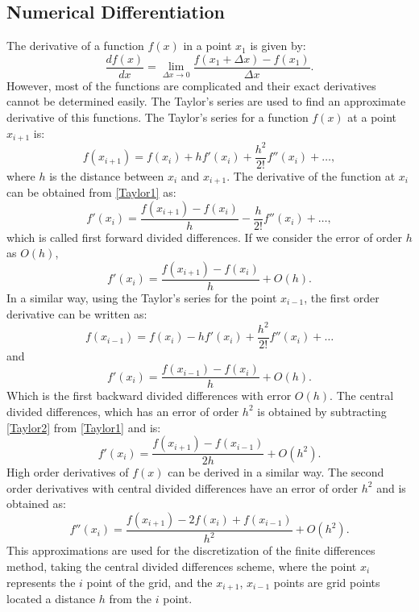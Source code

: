 \documentclass[12pt]{report}
\begin{document}
\subsection{Numerical Differentiation} 
The derivative of a function $f(x)$ in a point $x_1$ is given by:
\begin{equation*}
 \frac{df(x)}{dx}=\lim_{\Delta x\rightarrow 0} \frac{f(x_1+\Delta x) -f(x_1)}{\Delta x}.
\end{equation*}
However, most of the functions are complicated and their exact derivatives cannot be determined easily.
The Taylor's series are used to find an approximate derivative of this functions. The Taylor's series for a function $f(x)$ at a point $x_{i+1}$ is:
\begin{equation}
 f(x_{i+1})=f(x_i)+hf'(x_i)+\frac{h^2}{2!}f''(x_i)+\dots, \label{Taylor1}
\end{equation}
where $h$ is the distance between $x_i$ and $x_{i+1}$. The derivative of the function at $x_i$ can be obtained from \eqref{Taylor1} as:
\begin{equation*}
 f'(x_i)=\frac{f(x_{i+1})-f(x_i)}{h}-\frac{h}{2!}f''(x_i)+\dots,
\end{equation*}
which is called first forward divided differences. If we consider the error of order $h$ as $O(h)$,
\begin{equation*}
 f'(x_i)=\frac{f(x_{i+1})-f(x_i)}{h}+O(h). 
\end{equation*}
 In a similar way, using the Taylor's series for the point $x_{i-1}$, the first order derivative can be written as:
 \begin{equation}
 f(x_{i-1})=f(x_i)-hf'(x_i)+\frac{h^2}{2!}f''(x_i)+\dots \label{Taylor2}
\end{equation}
and 
\begin{equation*}
 f'(x_i)=\frac{f(x_{i-1})-f(x_i)}{h}+O(h). 
\end{equation*}
Which is the first backward divided differences with error $O(h)$.
The central divided differences, which has an error of order $h^2$ is obtained by subtracting 
\eqref{Taylor2} from \eqref{Taylor1} and is:
\begin{equation}
 f'(x_i)=\frac{f(x_{i+1})-f(x_{i-1})}{2h}+O(h^2). 
\end{equation}
High order derivatives of $f(x)$ can be derived in a similar way. The second order derivatives with central divided 
differences have an error of order $h^2$ and is obtained as:
\begin{equation}
 f''(x_i)=\frac{f(x_{i+1})-2f(x_i)+f(x_{i-1})}{h^2}+O(h^2). \label{der2}
\end{equation}
This approximations are used for the discretization of the finite differences method, taking the central divided differences scheme, 
where the point $x_i$ represents the $i$ point of the grid, and the $x_{i+1}$, $x_{i-1}$ points are grid points located a distance $h$ from the $i$ point.
\end{document}
